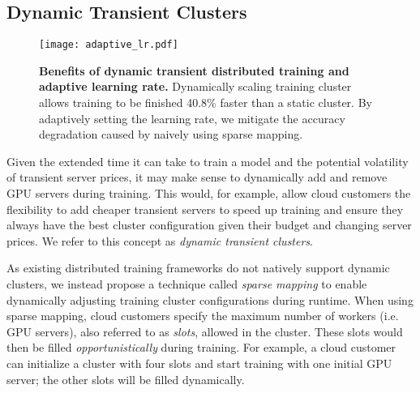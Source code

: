 

\subsection{Dynamic Transient Clusters}


\begin{figure}[t]
\centering
    \texttt{[image: adaptive\_lr.pdf]}
    \caption{\textbf{Benefits of dynamic transient distributed training and adaptive learning rate.}
    Dynamically scaling training cluster allows training to be finished 40.8\% faster than a static cluster. 
    By adaptively setting the learning rate, we mitigate the accuracy degradation caused by naively using sparse mapping.}
    \label{fig:adaptive_lr}
\end{figure}

Given the extended time it can take to train a model and the potential 
volatility of transient server prices, it may make sense to dynamically add and
remove GPU servers during training. This would, for example, allow cloud
customers the flexibility to add cheaper transient servers to speed up
training and ensure they always have the best cluster
configuration given their budget and changing server prices. We refer
to this concept as \emph{dynamic transient clusters}.  

As existing distributed training frameworks do not natively support dynamic
clusters, we instead propose a technique called  \emph{sparse mapping} to
enable dynamically adjusting training cluster configurations during runtime.
When using sparse mapping, cloud customers specify the maximum number of
workers (i.e. GPU servers), also referred to as \emph{slots}, allowed in the cluster. These
slots would then be filled \emph{opportunistically} during training.  For example, a
cloud customer can initialize a cluster with four slots and start training with one
initial GPU server; the other slots will be filled dynamically.  


